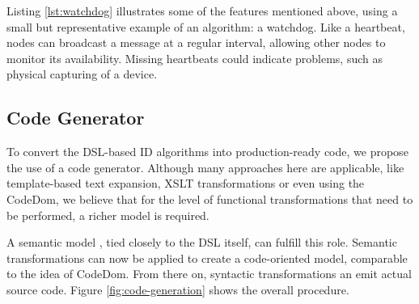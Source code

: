 \documentclass[conference]{IEEEtran}
\newcommand{\NAME}{id-foo\xspace}
\begin{document}
Listing \ref{lst:watchdog} illustrates some of the features mentioned above,
using a small but representative example of an algorithm: a
watchdog\cite{mishra2004intrusion}. Like a heartbeat, nodes can broadcast a
message at a regular interval, allowing other nodes to monitor its
availability. Missing heartbeats could indicate problems, such as physical
capturing of a device.




\subsection*{Code Generator}

To convert the DSL-based ID algorithms into production-ready code, we propose
the use of a code generator. Although many approaches here are applicable, like
template-based text expansion, XSLT transformations or even using the
CodeDom\cite{dollard2004code}, we believe that for the level of functional
transformations that need to be performed, a richer model is required.

A semantic model \cite{fowler2010domain}, tied closely to the DSL itself, can
fulfill this role. Semantic transformations can now be applied to create a
code-oriented model, comparable to the idea of CodeDom. From there on,
syntactic transformations an emit actual source code. Figure
\ref{fig:code-generation} shows the overall procedure.
\end{document}

